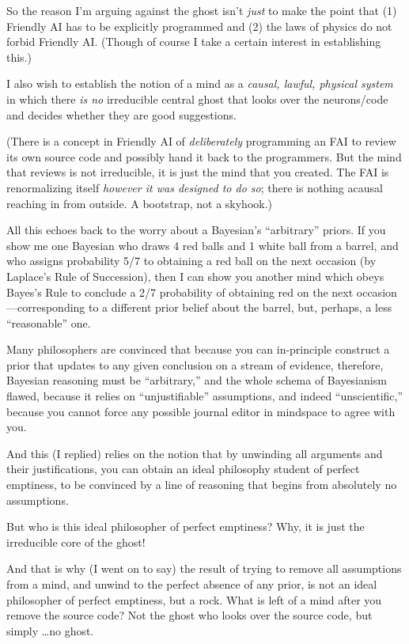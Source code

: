 {
 So the reason I'm arguing against the ghost
isn't \textit{just} to make the point that (1) Friendly
AI has to be explicitly programmed and (2) the laws of physics do not
forbid Friendly AI. (Though of course I take a certain interest in
establishing this.)}

{
 I also wish to establish the notion of a mind as a \textit{causal,
lawful, physical system} in which there \textit{is no} irreducible
central ghost that looks over the neurons/code and decides whether they
are good suggestions.}

{
 (There is a concept in Friendly AI of \textit{deliberately}
programming an FAI to review its own source code and possibly hand it
back to the programmers. But the mind that reviews is not irreducible,
it is just the mind that you created. The FAI is renormalizing itself
\textit{however it was designed to do so}; there is nothing acausal
reaching in from outside. A bootstrap, not a skyhook.)}

{
 All this echoes back to the worry about a
Bayesian's
``arbitrary'' priors. If you show me
one Bayesian who draws 4 red balls and 1 white ball from a barrel, and
who assigns probability 5/7 to obtaining a red ball on the next
occasion (by Laplace's Rule of Succession), then I can
show you another mind which obeys Bayes's Rule to
conclude a 2/7 probability of obtaining red on the next
occasion---corresponding to a different prior belief about the barrel,
but, perhaps, a less ``reasonable''
one.}

{
 Many philosophers are convinced that because you can in-principle
construct a prior that updates to any given conclusion on a stream of
evidence, therefore, Bayesian reasoning must be
``arbitrary,'' and the whole schema
of Bayesianism flawed, because it relies on
``unjustifiable'' assumptions, and
indeed ``unscientific,'' because you
cannot force any possible journal editor in mindspace to agree with
you.}

{
 And this (I replied) relies on the notion that by unwinding all
arguments and their justifications, you can obtain an ideal philosophy
student of perfect emptiness, to be convinced by a line of reasoning
that begins from absolutely no assumptions.}

{
 But who is this ideal philosopher of perfect emptiness? Why, it is
just the irreducible core of the ghost!}

{
 And that is why (I went on to say) the result of trying to remove
all assumptions from a mind, and unwind to the perfect absence of any
prior, is not an ideal philosopher of perfect emptiness, but a rock.
What is left of a mind after you remove the source code? Not the ghost
who looks over the source code, but simply \ldots no ghost.}

